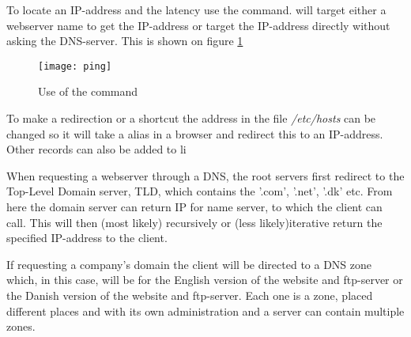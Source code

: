 \documentclass[Preamble]{subfiles}
\begin{document}
To locate an IP-address and the latency use the  command.
 will target either a webserver name to get the IP-address or target the IP-address directly without asking the DNS-server.
This is shown on figure \ref{fig:ping}


\begin{figure}[hbtp]
\centering
\texttt{[image: ping]}
\caption{Use of the command }
\label{fig:ping}
\end{figure}


To make a redirection or a shortcut the address in the file \textit{/etc/hosts} can be changed so it will take a alias in a browser and redirect this to an IP-address. Other records can also be added to li


When requesting a webserver through a DNS, the root servers first redirect to the Top-Level Domain server, TLD, which contains the '.com', '.net', '.dk' etc.
From here the domain server can return IP for name server, to which the client can call. 
This will then (most likely) recursively or (less likely)iterative return the specified IP-address to the client.


If requesting a company's domain the client will be directed to a DNS zone which, in this case, will be for the English version of the website and ftp-server or the Danish version of the website and ftp-server.
Each one is a zone, placed different places and with its own administration and a server can contain multiple zones.
\end{document}
